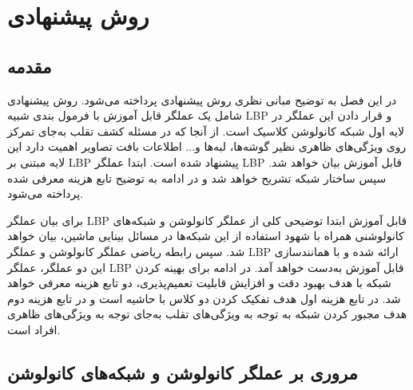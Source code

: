 
\chapter{روش پیشنهادی}
\section{مقدمه} 
در این فصل به توضیح مبانی نظری روش پیشنهادی پرداخته می‌شود. روش پیشنهادی شامل یک عملگر قابل آموزش با فرمول بندی شبیه LBP و قرار دادن این عملگر در لایه اول شبکه کانولوشن کلاسیک است. از آنجا که در مسئله کشف تقلب به‌جای تمرکز روی ویژگی‌های ظاهری نظیر گوشه‌ها، لبه‌ها و... اطلاعات بافت تصاویر اهمیت دارد این لایه مبتنی بر LBP پیشنهاد شده است. 
ابتدا عملگر LBP قابل آموزش بیان خواهد شد. سپس ساختار شبکه تشریح خواهد شد و در ادامه به توضیح تابع هزینه معرفی شده پرداخته می‌شود. 

برای بیان عملگر LBP قابل آموزش ابتدا توضیحی کلی از عملگر کانولوشن و شبکه‌های کانولوشنی همراه با شهود استفاده از این شبکه‌ها در مسائل بینایی ماشین، بیان خواهد شد. سپس رابطه ریاضی عملگر کانولوشن و عملگر LBP ارائه شده و با همانندسازی این دو عملگر، عملگر LBP قابل آموزش به‌دست خواهد آمد.
در ادامه برای بهینه کردن شبکه با هدف بهبود دقت و افزایش قابلیت تعمیم‌پذیری، دو تابع هزینه معرفی خواهد شد. در تابع هزینه اول هدف تفکیک کردن دو کلاس با حاشیه است و در تابع هزینه دوم هدف مجبور کردن شبکه به توجه به ویژگی‌های تقلب به‌جای توجه به ویژگی‌های ظاهری افراد است.
 
\section{مروری بر عملگر کانولوشن و شبکه‌های کانولوشن}
	
